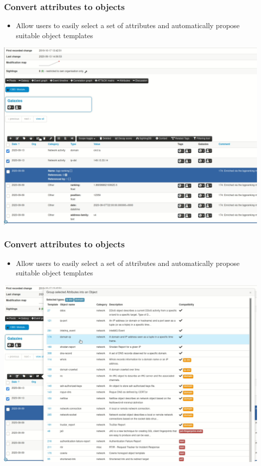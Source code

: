 \begin{frame}
\frametitle{Convert attributes to objects}
\begin{itemize}
    \item Allow users to easily select a set of attributes and automatically propose suitable object templates
\end{itemize}
\begin{center}
    \includegraphics[scale=0.15]{attributes_to_object_1.png}
\end{center}
\end{frame}

\begin{frame}
\frametitle{Convert attributes to objects}
\begin{itemize}
    \item Allow users to easily select a set of attributes and automatically propose suitable object templates
\end{itemize}
\begin{center}
    \includegraphics[scale=0.15]{attributes_to_object_2.png}
\end{center}
\end{frame}

